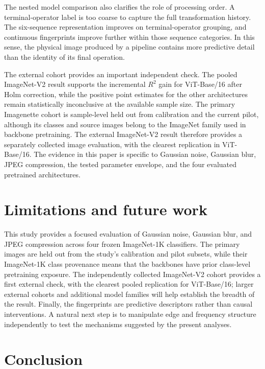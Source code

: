\documentclass[10pt,twocolumn]{article}
\begin{document}
The nested model comparison also clarifies the role of processing order. A terminal-operator label is too coarse to capture the full transformation history. The six-sequence representation improves on terminal-operator grouping, and continuous fingerprints improve further within those sequence categories. In this sense, the physical image produced by a pipeline contains more predictive detail than the identity of its final operation.

The external cohort provides an important independent check. The pooled ImageNet-V2 result supports the incremental $R^2$ gain for ViT-Base/16 after Holm correction, while the positive point estimates for the other architectures remain statistically inconclusive at the available sample size. The primary Imagenette cohort is sample-level held out from calibration and the current pilot, although its classes and source images belong to the ImageNet family used in backbone pretraining. The external ImageNet-V2 result therefore provides a separately collected image evaluation, with the clearest replication in ViT-Base/16. The evidence in this paper is specific to Gaussian noise, Gaussian blur, JPEG compression, the tested parameter envelope, and the four evaluated pretrained architectures.

\section{Limitations and future work}

This study provides a focused evaluation of Gaussian noise, Gaussian blur, and JPEG compression across four frozen ImageNet-1K classifiers. The primary images are held out from the study's calibration and pilot subsets, while their ImageNet-1K class provenance means that the backbones have prior class-level pretraining exposure. The independently collected ImageNet-V2 cohort provides a first external check, with the clearest pooled replication for ViT-Base/16; larger external cohorts and additional model families will help establish the breadth of the result. Finally, the fingerprints are predictive descriptors rather than causal interventions. A natural next step is to manipulate edge and frequency structure independently to test the mechanisms suggested by the present analyses.

\section{Conclusion}
\end{document}
